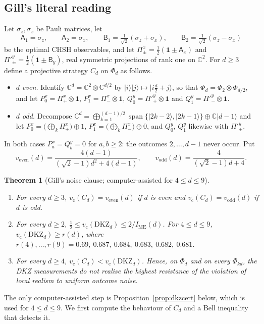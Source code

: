 \documentclass[11pt]{amsart}
\newtheorem{theorem}{Theorem}[section]
\theoremstyle{definition}
\theoremstyle{remark}
\numberwithin{equation}{section}
\newcommand{\C}{\mathbb{C}}
\newcommand{\IME}{I_{\mathrm{ME}}}
\newcommand{\one}{\mathbf{1}}
\newcommand{\vc}{v_{\mathrm c}}
\newcommand{\veven}{v_{\mathrm{even}}}
\newcommand{\vodd}{v_{\mathrm{odd}}}
\newcommand{\DKZ}{\mathrm{DKZ}}
\begin{document}
\subsection{Gill's literal reading}\label{subsec:literal}
Let $\sigma_z,\sigma_x$ be Pauli matrices, let
\[
\mathsf A_1=\sigma_z,\qquad\mathsf A_2=\sigma_x,\qquad\mathsf B_1=\tfrac1{\sqrt2}(\sigma_z+\sigma_x),\qquad
\mathsf B_2=\tfrac1{\sqrt2}(\sigma_z-\sigma_x)
\]
be the optimal CHSH observables, and let $\Pi^x_\pm=\frac12(\one\pm\mathsf A_x)$ and $\Pi'^y_\pm=\frac12(\one\pm\mathsf B_y)$,
real symmetric projections of rank one on $\C^2$. For $d\ge3$ define a projective strategy $C_d$ on $\Phi_d$ as
follows.
\begin{itemize}
\item \emph{$d$ even.} Identify $\C^d=\C^2\otimes\C^{d/2}$ by $|i\rangle|j\rangle\mapsto|i\tfrac d2+j\rangle$, so that
$\Phi_d=\Phi_2\otimes\Phi_{d/2}$, and let $P^x_0=\Pi^x_+\otimes\one$, $P^x_1=\Pi^x_-\otimes\one$,
$Q^y_0=\Pi'^y_+\otimes\one$ and $Q^y_1=\Pi'^y_-\otimes\one$.
\item \emph{$d$ odd.} Decompose
$\C^d=\bigoplus_{k=1}^{(d-1)/2}\operatorname{span}\{|2k-2\rangle,|2k-1\rangle\}\oplus\C|d-1\rangle$ and let
$P^x_0=\bigl(\bigoplus_k\Pi^x_+\bigr)\oplus1$, $P^x_1=\bigl(\bigoplus_k\Pi^x_-\bigr)\oplus0$, and $Q^y_0$, $Q^y_1$
likewise with $\Pi'^y_\pm$.
\end{itemize}
In both cases $P^x_a=Q^y_b=0$ for $a,b\ge2$: the outcomes $2,\dots,d-1$ never occur. Put
\[
\veven(d)=\frac{4(d-1)}{(\sqrt2-1)d^2+4(d-1)},\qquad\vodd(d)=\frac4{(\sqrt2-1)d+4}.
\]

\begin{theorem}[Gill's noise clause; computer-assisted for $4\le d\le9$]\label{thm:literal}
\begin{enumerate}
\item For every $d\ge3$, $\vc(C_d)=\veven(d)$ if $d$ is even and $\vc(C_d)=\vodd(d)$ if $d$ is odd.
\item For every $d\ge2$, $\frac12\le\vc(\DKZ_d)\le2/\IME(d)$. For $4\le d\le9$, $\vc(\DKZ_d)\ge r(d)$, where
$r(4),\dots,r(9)=0.69,\ 0.687,\ 0.684,\ 0.683,\ 0.682,\ 0.681$.
\item For every $d\ge4$, $\vc(C_d)<\vc(\DKZ_d)$. Hence, on $\Phi_d$ and on every $\Phi_{kd}$, the DKZ measurements do
not realise the highest resistance of the violation of local realism to uniform outcome noise.
\end{enumerate}
\end{theorem}

The only computer-assisted step is Proposition~\ref{prop:dkzcert} below, which is used for $4\le d\le9$. We first
compute the behaviour of $C_d$ and a Bell inequality that detects it.
\end{document}
